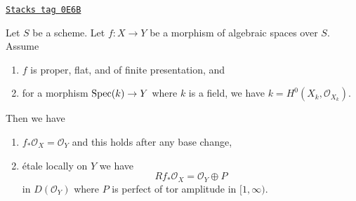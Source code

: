 \begin{lemma}
\label{spaces-perfect-lemma-proper-flat-h0}
\href{https://stacks.math.columbia.edu/tag/0E6B}{\texttt{Stacks tag 0E6B}}

Let $S$ be a scheme.
Let $f : X \to Y$ be a morphism of algebraic spaces over $S$. Assume
\begin{enumerate}
\item $f$ is proper, flat, and of finite presentation, and
\item for a morphism $\operatorname{Spec}(k) \to Y$ where $k$ is a field, we have
$k = H^0(X_k, \mathcal{O}_{X_k})$.
\end{enumerate}
Then we have
\begin{enumerate}
\item[(a)] $f_*\mathcal{O}_X = \mathcal{O}_Y$ and
this holds after any base change,
\item[(b)] \'etale locally on $Y$ we have
$$
Rf_*\mathcal{O}_X = \mathcal{O}_Y \oplus P
$$
in $D(\mathcal{O}_Y)$
where $P$ is perfect of tor amplitude in $[1, \infty)$.
\end{enumerate}
\end{lemma}

